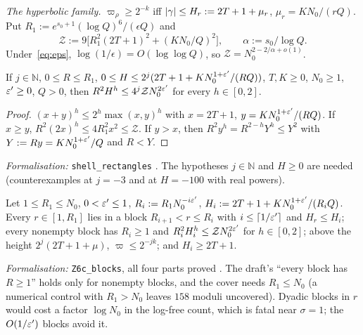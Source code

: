 \emph{The hyperbolic family.} $\varpi_\rho\ge2^{-k}$ iff $\lvert \gamma\rvert\le H_r:=2T+1+\mu_r$, $\mu_r=KN_0/(rQ)$. Put $R_1:=e^{s_0+1}(\log Q)^6/(\epsilon Q)$ and
\begin{equation}\label{eq:shell-Zsize}
\mathcal Z:=9\bigl[R_1^2(2T+1)^2+(KN_0/Q)^2\bigr],\qquad\alpha:=s_0/\log Q .
\end{equation}
Under~\eqref{eq:eps}, $\log(1/\epsilon)=O(\log\log Q)$, so $\mathcal Z=N_0^{2-2/\alpha+o(1)}$.

\begin{lemma}\label{lem:shell-6b}
If $j\in\mathbb N$, $0\le R\le R_1$, $0\le H\le2^j(2T+1+KN_0^{1+\varepsilon'}/(RQ))$, $T,K\ge0$, $N_0\ge1$, $\varepsilon'\ge0$, $Q>0$, then $R^2H^h\le4^j\mathcal ZN_0^{2\varepsilon'}$ for every
$h\in[0,2]$.
\end{lemma}
\begin{proof}
$(x+y)^h\le2^h\max(x,y)^h$ with $x=2T+1$, $y=KN_0^{1+\varepsilon'}/(RQ)$. If $x\ge y$, $R^2(2x)^h\le4R_1^2x^2\le\mathcal Z$. If $y>x$, then $R^2y^h=R^{2-h}Y^h\le Y^2$ with
$Y:=Ry=KN_0^{1+\varepsilon'}/Q$ and $R<Y$.
\end{proof}
\emph{Formalisation:} \texttt{shell\_rectangles} \tagL. The hypotheses $j\in\mathbb N$ and $H\ge0$ are needed (counterexamples at $j=-3$ and at
$H=-100$ with real powers).

\begin{lemma}\label{lem:shell-6c}
Let $1\le R_1\le N_0$, $0<\varepsilon'\le1$, $R_i:=R_1N_0^{-i\varepsilon'}$, $H_i:=2T+1+KN_0^{1+\varepsilon'}/(R_iQ)$. Every $r\in[1,R_1]$ lies in a block $R_{i+1}<r\le R_i$ with
$i\le\lceil1/\varepsilon'\rceil$ and $H_r\le H_i$; every nonempty block has $R_i\ge1$ and $R_i^2H_i^h\le\mathcal ZN_0^{2\varepsilon'}$ for $h\in[0,2]$; above the height $2^j(2T+1+\mu)$,
$\varpi\le2^{-jk}$; and $H_i\ge2T+1$.
\end{lemma}
\emph{Formalisation:} \texttt{Z6c\_blocks}, all four parts proved \tagL. The draft's ``every block has $R\ge1$'' holds only for
nonempty blocks, and the cover needs $R_1\le N_0$ (a numerical control with $R_1>N_0$ leaves $158$ moduli uncovered). Dyadic blocks in $r$ would cost a
factor $\log N_0$ in the log-free count, which is fatal near $\sigma=1$; the $O(1/\varepsilon')$ blocks avoid it.

